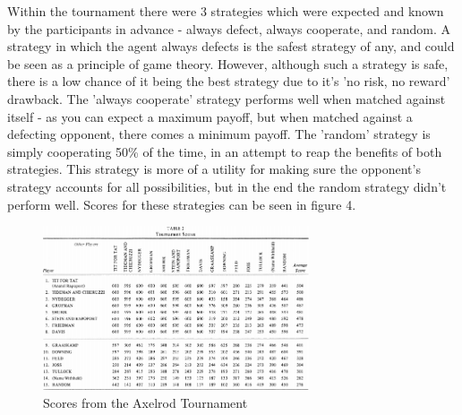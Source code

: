\documentclass[12pt,a4paper]{article}
\begin{document}
Within the tournament there were 3 strategies which were expected and known by the participants in advance - always defect, always cooperate, and random. A strategy in which the agent always defects is the safest strategy of any, and could be seen as a principle of game theory. However, although such a strategy is safe, there is a low chance of it being the best strategy due to it's 'no risk, no reward' drawback. The 'always cooperate' strategy performs well when matched against itself - as you can expect a maximum payoff, but when matched against a defecting opponent, there comes a minimum payoff. The 'random' strategy is simply cooperating 50\% of the time, in an attempt to reap the benefits of both strategies. This strategy is more of a utility for making sure the opponent's strategy accounts for all possibilities, but in the end the random strategy didn't perform well. Scores for these strategies can be seen in figure 4.

\begin{figure}[H]
	\centering
		\includegraphics[width=0.7\textwidth]{AxelrodTournamentScores}
		\caption{Scores from the Axelrod Tournament\cite[p.~11]{3}}
\end{figure}
\end{document}
